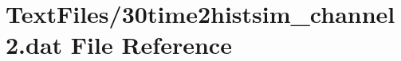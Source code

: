 \hypertarget{30time2histsim__channel2_8dat}{}\section{Text\+Files/30time2histsim\+\_\+channel2.dat File Reference}
\label{30time2histsim__channel2_8dat}
